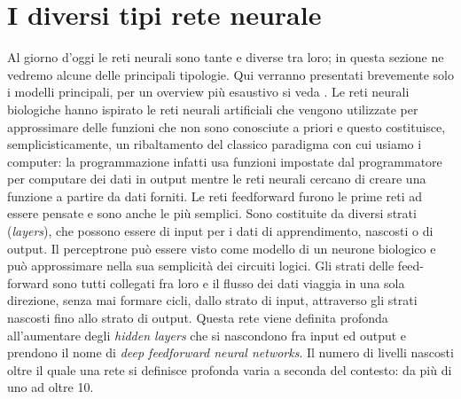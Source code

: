 \section{I diversi tipi rete neurale}
Al giorno d'oggi le reti neurali sono tante e diverse tra loro; in questa sezione ne vedremo alcune delle principali tipologie. Qui verranno presentati brevemente solo i modelli principali, per un overview più esaustivo si veda \cite{networks_zoo}.
Le reti neurali biologiche hanno ispirato le reti neurali artificiali che vengono utilizzate per approssimare delle funzioni che non sono conosciute a priori \cite{wiki:tipi} e questo costituisce, semplicisticamente, un ribaltamento del classico paradigma con cui usiamo i computer: la programmazione infatti usa funzioni impostate dal programmatore per computare dei dati in output mentre le reti neurali cercano di creare una funzione a partire da dati forniti.
Le reti feedforward furono le prime reti ad essere pensate e sono anche le più semplici. Sono costituite da diversi strati (\textit{layers}), che possono essere di input per i dati di apprendimento, nascosti o di output.
Il perceptrone può essere visto come modello di un neurone biologico e può approssimare nella sua semplicità dei circuiti logici. Gli strati delle feed-forward sono tutti collegati fra loro e il flusso dei dati viaggia in una sola direzione, senza mai formare cicli, dallo strato di input, attraverso gli strati nascosti fino allo strato di output. Questa rete viene definita profonda all'aumentare degli \textit{hidden layers} che si nascondono fra input ed output e prendono il nome di \textit{deep feedforward neural networks}. Il numero di livelli nascosti oltre il quale una rete si definisce profonda varia a seconda del contesto: da più di uno ad oltre 10.


\begin{figure}[hbtb]
\centering
{} \quad
{} \quad
{}\\

\label{fig:subfig}
\end{figure}

